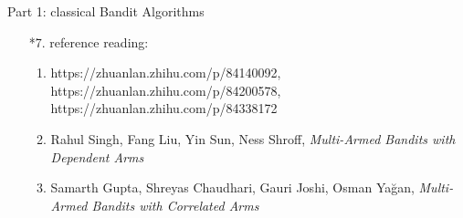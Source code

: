 \documentclass{article}
\begin{document}
\begin{homeworkProblem}{Part 1: classical Bandit Algorithms}
\begin{enumerate}
\begin{enumerate}
        \end{enumerate}
        With programming and testing, we found that using UCB for choosing the cluster and using TS to choose the specific arm can give a result better than the original TS,
        which has the best performance in the three classical bandit algorithms. The algorithm we used is shown on the next page.
        \item[*7.] reference reading:
        \begin{enumerate}[1]
            \item https://zhuanlan.zhihu.com/p/84140092, https://zhuanlan.zhihu.com/p/84200578, \\
            https://zhuanlan.zhihu.com/p/84338172
            \item Rahul Singh, Fang Liu, Yin Sun, Ness Shroff, \textsl{Multi-Armed Bandits with Dependent Arms}
            \item Samarth Gupta, Shreyas Chaudhari, Gauri Joshi, Osman Yağan, \textsl{Multi-Armed Bandits with Correlated Arms}

        \end{enumerate}
    \end{enumerate}
\end{homeworkProblem}
\pagebreak
\end{document}
